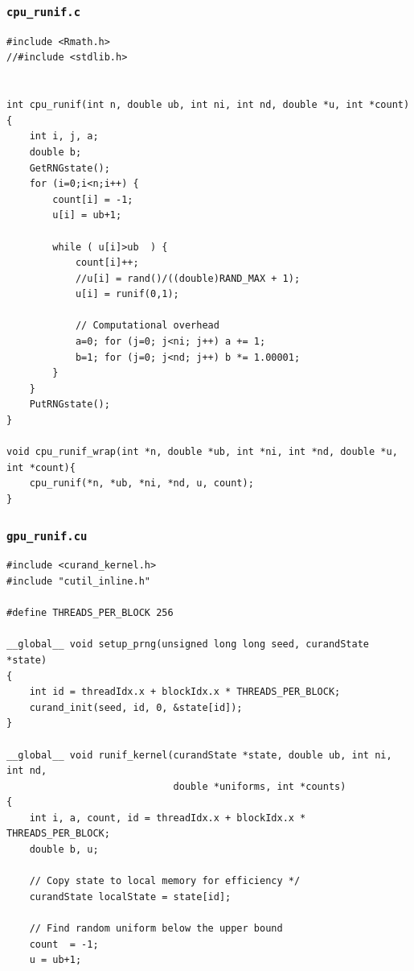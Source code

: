 \documentclass[handout]{beamer}
\numberwithin{equation}{section}
\begin{document}
\begin{frame}[fragile]
\frametitle{{\tt cpu\_runif.c}} \lstset{basicstyle=\tiny}
\begin{lstlisting}[name=cpurunif]
#include <Rmath.h>
//#include <stdlib.h>


int cpu_runif(int n, double ub, int ni, int nd, double *u, int *count)
{
    int i, j, a;
    double b;
    GetRNGstate();
    for (i=0;i<n;i++) {
        count[i] = -1;
        u[i] = ub+1;

        while ( u[i]>ub  ) {
            count[i]++;
            //u[i] = rand()/((double)RAND_MAX + 1);
            u[i] = runif(0,1);

            // Computational overhead
            a=0; for (j=0; j<ni; j++) a += 1;
            b=1; for (j=0; j<nd; j++) b *= 1.00001;
        }
    }
    PutRNGstate();
}

void cpu_runif_wrap(int *n, double *ub, int *ni, int *nd, double *u, int *count){
    cpu_runif(*n, *ub, *ni, *nd, u, count);
}
\end{lstlisting}
\end{frame}





\begin{frame}[fragile]
\frametitle{{\tt gpu\_runif.cu}} \lstset{basicstyle=\tiny}
\begin{lstlisting}[name=gpurunif]
#include <curand_kernel.h>
#include "cutil_inline.h"

#define THREADS_PER_BLOCK 256

__global__ void setup_prng(unsigned long long seed, curandState *state)
{
    int id = threadIdx.x + blockIdx.x * THREADS_PER_BLOCK;
    curand_init(seed, id, 0, &state[id]);
}

__global__ void runif_kernel(curandState *state, double ub, int ni, int nd, 
                             double *uniforms, int *counts)
{
    int i, a, count, id = threadIdx.x + blockIdx.x * THREADS_PER_BLOCK;
    double b, u;

    // Copy state to local memory for efficiency */
    curandState localState = state[id];

    // Find random uniform below the upper bound 
    count  = -1;
    u = ub+1;
\end{lstlisting}
\end{frame}
\end{document}
